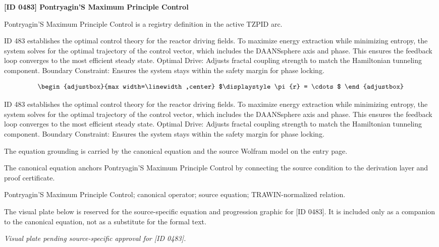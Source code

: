 \clearpage
\noindent\textbf{[ID 0483] Pontryagin'S Maximum Principle Control}\par
\vspace{0.35em}
\begingroup\small
{}
Pontryagin'S Maximum Principle Control is a registry definition in the active TZPID arc.

ID 483 establishes the optimal control theory for the reactor driving fields. To maximize energy extraction while minimizing entropy, the system solves for the optimal trajectory of the control vector, which includes the DAANSsphere axis and phase. This ensures the feedback loop converges to the most efficient steady state. Optimal Drive: Adjusts fractal coupling strength to match the Hamiltonian tunneling component. Boundary Constraint: Ensures the system stays within the safety margin for phase locking.

\[
\begin{adjustbox}{max width=\linewidth,center}
$\displaystyle
\pi {r} = \cdots
$
\end{adjustbox}
\]

ID 483 establishes the optimal control theory for the reactor driving fields. To maximize energy extraction while minimizing entropy, the system solves for the optimal trajectory of the control vector, which includes the DAANSsphere axis and phase. This ensures the feedback loop converges to the most efficient steady state. Optimal Drive: Adjusts fractal coupling strength to match the Hamiltonian tunneling component. Boundary Constraint: Ensures the system stays within the safety margin for phase locking.

The equation grounding is carried by the canonical equation and the source Wolfram model on the entry page.

The canonical equation anchors Pontryagin'S Maximum Principle Control by connecting the source condition to the derivation layer and proof certificate.

Pontryagin'S Maximum Principle Control; canonical operator; source equation; TRAWIN-normalized relation.
\endgroup

\begingroup\footnotesize\sloppy
The visual plate below is reserved for the source-specific equation and progression graphic for [ID 0483]. It is included only as a companion to the canonical equation, not as a substitute for the formal text.
\par\endgroup
\begingroup\footnotesize\itshape
Visual plate pending source-specific approval for [ID 0483].
\par\endgroup


